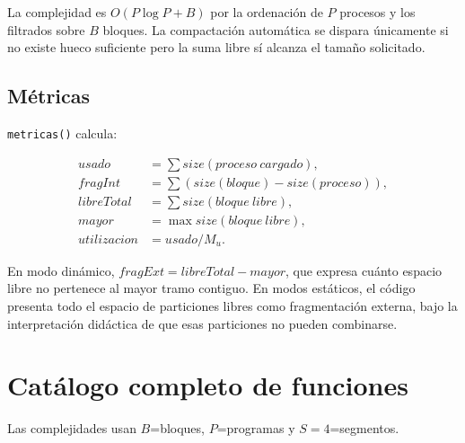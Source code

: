 \documentclass[11pt,a4paper]{article}
\newcommand{\funcion}[1]{\texttt{#1()}}
\begin{document}
La complejidad es \(O(P\log P+B)\) por la ordenación de \(P\) procesos y los
filtrados sobre \(B\) bloques. La compactación automática se dispara únicamente
si no existe hueco suficiente pero la suma libre sí alcanza el tamaño solicitado.

\subsection{Métricas}

\funcion{metricas} calcula:

\begin{align*}
  usado &= \sum size(proceso\ cargado),\\
  fragInt &= \sum (size(bloque)-size(proceso)),\\
  libreTotal &= \sum size(bloque\ libre),\\
  mayor &= \max size(bloque\ libre),\\
  utilizacion &= usado/M_u.
\end{align*}

En modo dinámico, \(fragExt=libreTotal-mayor\), que expresa cuánto espacio libre
no pertenece al mayor tramo contiguo. En modos estáticos, el código presenta todo
el espacio de particiones libres como fragmentación externa, bajo la interpretación
didáctica de que esas particiones no pueden combinarse.

\section{Catálogo completo de funciones}

Las complejidades usan \(B\)=bloques, \(P\)=programas y \(S=4\)=segmentos.
\end{document}
